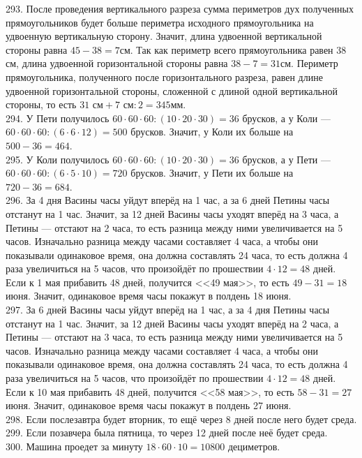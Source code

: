 \documentclass[12pt]{article}
\begin{document}
293. После проведения вертикального разреза сумма периметров дух полученных прямоугольников будет больше периметра исходного прямоугольника на удвоенную вертикальную сторону. Значит, длина удвоенной вертикальной стороны равна $45-38=7$см. Так как периметр всего прямоугольника равен 38 см, длина удвоенной горизонтальной стороны равна $38-7=31$см. Периметр прямоугольника, полученного после горизонтального разреза, равен длине удвоенной горизонтальной стороны, сложенной с длиной одной вертикальной стороны, то есть $31\text{ см}+7\text{ см}:2=345$мм.\\
294. У Пети получилось $60\cdot60\cdot60:(10\cdot20\cdot30)=36$ брусков, а у Коли --- $60\cdot60\cdot60:(6\cdot6\cdot12)=500$ брусков. Значит, у Коли их больше на $500-36=464.$\\
295. У Коли получилось $60\cdot60\cdot60:(10\cdot20\cdot30)=36$ брусков, а у Пети --- $60\cdot60\cdot60:(6\cdot5\cdot10)=720$ брусков. Значит, у Пети их больше на $720-36=684.$\\
296. За 4 дня Васины часы уйдут вперёд на 1 час, а за 6 дней Петины часы отстанут на 1 час. Значит, за 12 дней Васины часы уходят вперёд на 3 часа, а Петины --- отстают на 2 часа, то есть разница между ними увеличивается на 5 часов. Изначально разница между часами составляет 4 часа, а чтобы они показывали одинаковое время, она должна составлять 24 часа, то есть должна 4 раза увеличиться на 5 часов, что произойдёт по прошествии $4\cdot12=48$ дней. Если к 1 мая прибавить 48 дней, получится <<49 мая>>, то есть $49-31=18$ июня. Значит, одинаковое время часы покажут в полдень 18 июня.\\
297. За 6 дней Васины часы уйдут вперёд на 1 час, а за 4 дня Петины часы отстанут на 1 час. Значит, за 12 дней Васины часы уходят вперёд на 2 часа, а Петины --- отстают на 3 часа, то есть разница между ними увеличивается на 5 часов. Изначально разница между часами составляет 4 часа, а чтобы они показывали одинаковое время, она должна составлять 24 часа, то есть должна 4 раза увеличиться на 5 часов, что произойдёт по прошествии $4\cdot12=48$ дней. Если к 10 мая прибавить 48 дней, получится <<58 мая>>, то есть $58-31=27$ июня. Значит, одинаковое время часы покажут в полдень 27 июня.\\
298. Если послезавтра будет вторник, то ещё через 8 дней после него будет среда.\\
299. Если позавчера была пятница, то через 12 дней после неё будет среда.\\
300. Машина проедет за минуту $18\cdot60\cdot10=10800$ дециметров.\\
\end{document}
